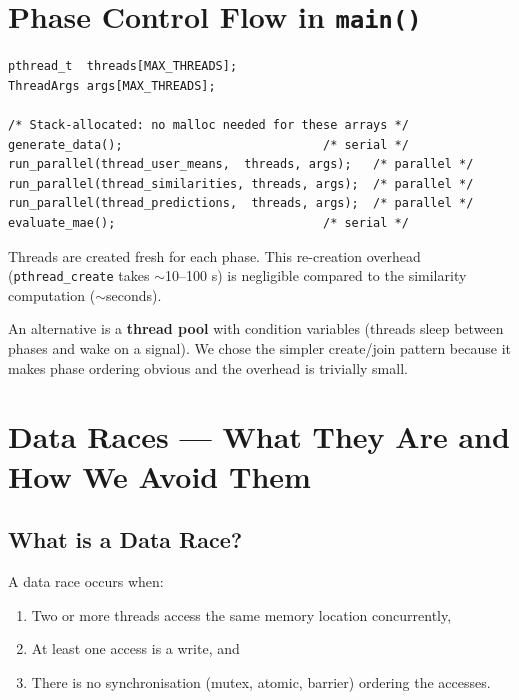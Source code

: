 \documentclass[12pt,a4paper]{article}
\begin{document}
\section{Phase Control Flow in \texttt{main()}}

\begin{lstlisting}
pthread_t  threads[MAX_THREADS];
ThreadArgs args[MAX_THREADS];

/* Stack-allocated: no malloc needed for these arrays */
generate_data();                            /* serial */
run_parallel(thread_user_means,  threads, args);   /* parallel */
run_parallel(thread_similarities, threads, args);  /* parallel */
run_parallel(thread_predictions,  threads, args);  /* parallel */
evaluate_mae();                             /* serial */
\end{lstlisting}

Threads are created fresh for each phase.  This re-creation overhead
(\texttt{pthread\_create} takes $\sim$10--100 \textmu s) is negligible
compared to the similarity computation ($\sim$seconds).

An alternative is a \textbf{thread pool} with condition variables (threads
sleep between phases and wake on a signal).  We chose the simpler
create/join pattern because it makes phase ordering obvious and the overhead
is trivially small.

\section{Data Races — What They Are and How We Avoid Them}

\subsection{What is a Data Race?}

A data race occurs when:
\begin{enumerate}
    \item Two or more threads access the same memory location concurrently,
    \item At least one access is a write, and
    \item There is no synchronisation (mutex, atomic, barrier) ordering the accesses.
\end{enumerate}
\end{document}
